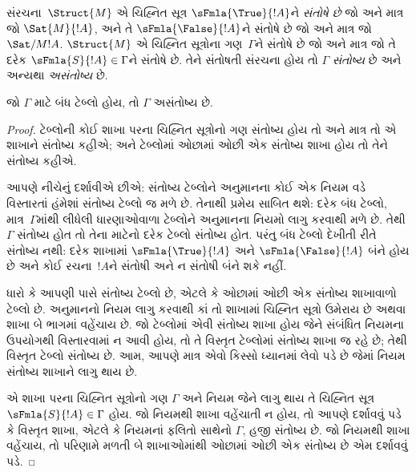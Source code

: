 \begin{defn}
સંરચના~$\Struct{M}$
એ ચિહ્નિત સૂત્ર $\sFmla{\True}{!A}$ને \emph{સંતોષે છે} જો અને
માત્ર જો $\Sat{M}{!A}$, અને તે
$\sFmla{\False}{!A}$ને સંતોષે છે જો અને માત્ર જો
$\Sat/{M}{!A}$. $\Struct{M}$
એ ચિહ્નિત સૂત્રોના ગણ~$\Gamma$ને સંતોષે છે જો અને માત્ર જો તે
દરેક $\sFmla{S}{!A} \in \Gamma$ને સંતોષે છે. તેને સંતોષતી
સંરચના હોય તો $\Gamma$
\emph{સંતોષ્ય} છે અને અન્યથા \emph{અસંતોષ્ય} છે.
\end{defn}

\begin{thm}[યથાર્થતા]
  જો $\Gamma$ માટે બંધ ટેબ્લો હોય, તો $\Gamma$ અસંતોષ્ય છે.
\end{thm}

\begin{proof}
ટેબ્લોની કોઈ શાખા પરના ચિહ્નિત સૂત્રોનો ગણ સંતોષ્ય હોય તો
અને માત્ર તો એ શાખાને સંતોષ્ય કહીએ; અને ટેબ્લોમાં ઓછામાં ઓછી એક
સંતોષ્ય શાખા હોય તો તેને સંતોષ્ય કહીએ.

આપણે નીચેનું દર્શાવીએ છીએ: સંતોષ્ય ટેબ્લોને અનુમાનના કોઈ એક નિયમ
વડે વિસ્તારતાં હંમેશાં સંતોષ્ય ટેબ્લો જ મળે છે. તેનાથી પ્રમેય
સાબિત થશે: દરેક બંધ ટેબ્લો, માત્ર~$\Gamma$માંથી લીધેલી ધારણાઓવાળા
ટેબ્લોને અનુમાનના નિયમો લાગુ કરવાથી મળે છે. તેથી $\Gamma$ સંતોષ્ય
હોત તો તેના માટેનો દરેક ટેબ્લો સંતોષ્ય હોત. પરંતુ બંધ ટેબ્લો
દેખીતી રીતે સંતોષ્ય નથી: દરેક શાખામાં $\sFmla{\True}{!A}$ અને
$\sFmla{\False}{!A}$ બંને હોય છે અને કોઈ રચના~$!A$ને સંતોષી અને ન
સંતોષી બંને શકે નહીં.

ધારો કે આપણી પાસે સંતોષ્ય ટેબ્લો છે, એટલે કે ઓછામાં ઓછી એક
સંતોષ્ય શાખાવાળો ટેબ્લો છે. અનુમાનનો નિયમ લાગુ કરવાથી કાં તો
શાખામાં ચિહ્નિત સૂત્રો ઉમેરાય છે અથવા શાખા બે ભાગમાં વહેંચાય છે.
જો ટેબ્લોમાં એવી સંતોષ્ય શાખા હોય જેને સંબંધિત નિયમના ઉપયોગથી
વિસ્તારવામાં ન આવી હોય, તો તે વિસ્તૃત ટેબ્લોમાં સંતોષ્ય શાખા જ
રહે છે; તેથી વિસ્તૃત ટેબ્લો સંતોષ્ય છે. આમ, આપણે માત્ર એવો કિસ્સો
ધ્યાનમાં લેવો પડે છે જેમાં નિયમ સંતોષ્ય શાખાને લાગુ થાય છે.

એ શાખા પરના ચિહ્નિત સૂત્રોનો ગણ $\Gamma$ અને નિયમ જેને લાગુ થાય
તે ચિહ્નિત સૂત્ર $\sFmla{S}{!A} \in \Gamma$ હોય. જો નિયમથી શાખા
વહેંચાતી ન હોય, તો આપણે દર્શાવવું પડે કે વિસ્તૃત શાખા, એટલે કે નિયમનાં
ફલિતો સાથેનો $\Gamma$, હજી સંતોષ્ય છે. જો નિયમથી શાખા વહેંચાય, તો
પરિણામે મળતી બે શાખાઓમાંથી ઓછામાં ઓછી એક સંતોષ્ય છે એમ દર્શાવવું પડે.


\end{proof}
